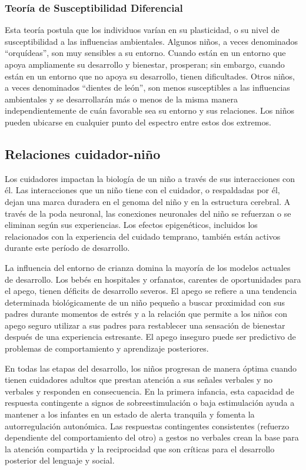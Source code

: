 \documentclass[11pt,letterpaper]{report}
\begin{document}
\subsubsection{Teoría de Susceptibilidad Diferencial}
Esta teoría postula que los individuos varían en su plasticidad, o su nivel de
susceptibilidad a las influencias ambientales. \cite{Belsky2021} Algunos niños,
a veces denominados ``orquídeas'', son muy sensibles a su entorno. Cuando están
en un entorno que apoya ampliamente su desarrollo y bienestar, prosperan; sin
embargo, cuando están en un entorno que no apoya su desarrollo, tienen
dificultades. Otros niños, a veces denominados ``dientes de león'', son menos
susceptibles a las influencias ambientales y se desarrollarán más o menos de la
misma manera independientemente de cuán favorable sea su entorno y sus
relaciones. Los niños pueden ubicarse en cualquier punto del espectro entre
estos dos extremos. \cite{Belsky2021}

\subsection{Relaciones cuidador-niño}
Los cuidadores impactan la biología de un niño a través de sus interacciones con
él. Las interacciones que un niño tiene con el cuidador, o respaldadas por él,
dejan una marca duradera en el genoma del niño y en la estructura cerebral.
A través de la poda neuronal, las conexiones neuronales del niño se refuerzan o
se eliminan según sus experiencias. Los efectos epigenéticos, incluidos los
relacionados con la experiencia del cuidado temprano, también están activos
durante este período de desarrollo. \cite{Roth2011}

La influencia del entorno de crianza domina la mayoría de los modelos actuales
de desarrollo. Los bebés en hospitales y orfanatos, carentes de oportunidades
para el apego, tienen déficits de desarrollo severos. El apego se refiere a
una tendencia determinada biológicamente de un niño pequeño a buscar
proximidad con sus padres durante momentos de estrés y a la relación que
permite a los niños con apego seguro utilizar a sus padres para restablecer una
sensación de bienestar después de una experiencia estresante. El apego inseguro
puede ser predictivo de problemas de comportamiento y aprendizaje posteriores.
\cite{Nelson19}

En todas las etapas del desarrollo, los niños progresan de manera óptima
cuando tienen cuidadores adultos que prestan atención a sus señales verbales y
no verbales y responden en consecuencia. En la primera infancia, esta
capacidad de respuesta contingente a signos de sobreestimulación o baja
estimulación ayuda a mantener a los infantes en un estado de alerta tranquila y
fomenta la autorregulación autonómica. Las respuestas contingentes consistentes
(refuerzo dependiente del comportamiento del otro) a gestos no verbales crean
la base para la atención compartida y la reciprocidad que son críticas para el
desarrollo posterior del lenguaje y social. \cite{Nelson19}
\end{document}
